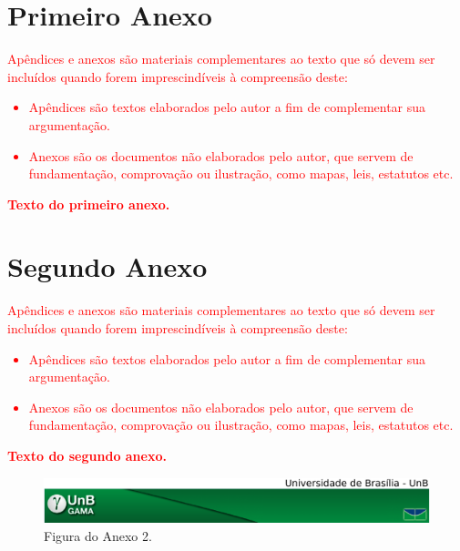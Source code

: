\begin{anexosenv}

\chapter{Primeiro Anexo}

\textcolor{red}{Apêndices e anexos são materiais complementares ao texto que só devem ser incluídos quando forem imprescindíveis à compreensão deste:}

\textcolor{red}{
\begin{itemize}
    \item Apêndices são textos elaborados pelo autor a fim de complementar sua argumentação.
    \item Anexos são os documentos não elaborados pelo autor, que servem de fundamentação, comprovação ou ilustração, como mapas, leis, estatutos etc.
\end{itemize}}
\textcolor{red}{\textbf{Texto do primeiro anexo.}}

\chapter{Segundo Anexo}
\textcolor{red}{Apêndices e anexos são materiais complementares ao texto que só devem ser incluídos quando forem imprescindíveis à compreensão deste:}

\textcolor{red}{
\begin{itemize}
    \item Apêndices são textos elaborados pelo autor a fim de complementar sua argumentação.
    \item Anexos são os documentos não elaborados pelo autor, que servem de fundamentação, comprovação ou ilustração, como mapas, leis, estatutos etc.
\end{itemize}}
\textcolor{red}{\textbf{Texto do segundo anexo.}}

\begin{figure}[htpb]
\centering
\includegraphics[width=\textwidth]{figuras/fga.png}
\caption{Figura do Anexo 2.}
\label{fig:fig_anexo}
\end{figure}

\end{anexosenv}
